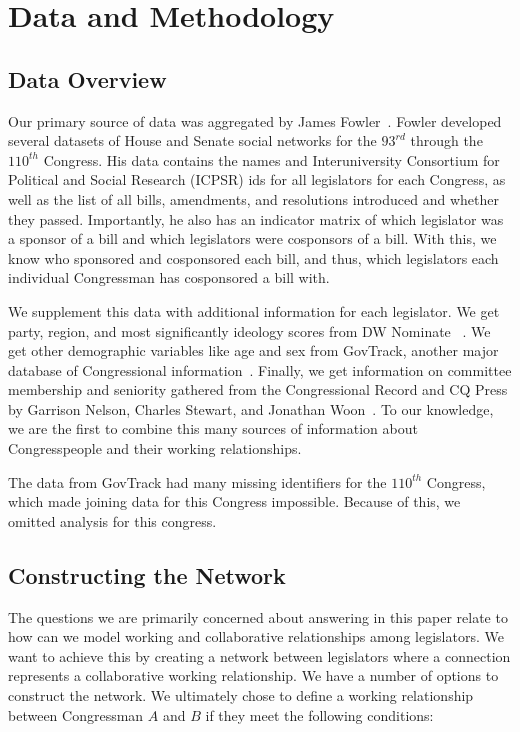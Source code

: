 \section{Data and Methodology}

\subsection{Data Overview}

Our primary source of data was aggregated by James Fowler~\cite{Fowler}. Fowler
developed several datasets of House and Senate social networks for the $93^{rd}$
through the $110^{th}$ Congress. His data contains the names and Interuniversity
Consortium for Political and Social Research (ICPSR) ids for all legislators for
each Congress, as well as the list of all bills, amendments, and resolutions
introduced and whether they passed. Importantly, he also has an indicator
matrix of which legislator was a sponsor of a bill and which legislators were
cosponsors of a bill. With this, we know who sponsored and cosponsored each
bill, and thus, which legislators each individual Congressman has cosponsored a
bill with.

We supplement this data with additional information for each legislator. We get
party, region, and most significantly ideology scores from DW Nominate
~\cite{DW-NOMINATE}. We get other demographic variables like age and sex from
GovTrack, another major database of Congressional information~\cite{GovTrack}.
Finally, we get information on committee membership and seniority gathered from
the Congressional Record and CQ Press by Garrison Nelson, Charles Stewart, and
Jonathan Woon~\cite{Nelson, Stewart}. To our knowledge, we are the first to
combine this many sources of information about Congresspeople and their working
relationships.

The data from GovTrack had many missing identifiers for the $110^{th}$ Congress,
which made joining data for this Congress impossible. Because of this, we
omitted analysis for this congress.

\subsection{Constructing the Network}

The questions we are primarily concerned about answering in this paper relate 
to how can we model working and collaborative relationships among legislators. 
We want to achieve this by creating a network between legislators where a 
connection represents a collaborative working relationship. We have a number of 
options to construct the network. We ultimately chose to define a working 
relationship between Congressman $A$ and $B$ if they meet the following 
conditions:

